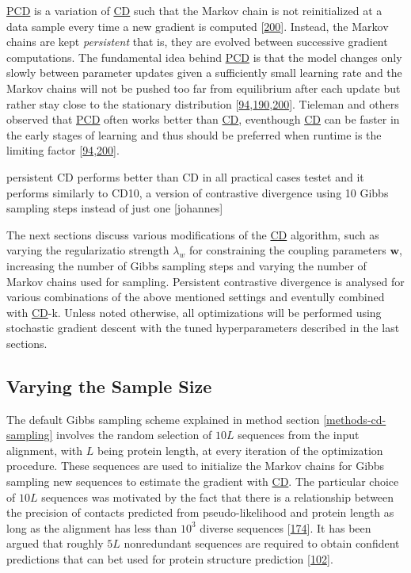 \documentclass[11pt,a4paper,twoside]{book}
\newcommand{\w}{\mathbf{w}}
\theoremstyle{definition}
\theoremstyle{definition}
\theoremstyle{remark}
\begin{document}
\protect\hyperlink{abbrev}{PCD} is a variation of
\protect\hyperlink{abbrev}{CD} such that the Markov chain is not
reinitialized at a data sample every time a new gradient is computed
{[}\protect\hyperlink{ref-Tieleman2008}{200}{]}. Instead, the Markov
chains are kept \emph{persistent} that is, they are evolved between
successive gradient computations. The fundamental idea behind
\protect\hyperlink{abbrev}{PCD} is that the model changes only slowly
between parameter updates given a sufficiently small learning rate and
the Markov chains will not be pushed too far from equilibrium after each
update but rather stay close to the stationary distribution
{[}\protect\hyperlink{ref-Murphy2012}{94},\protect\hyperlink{ref-Fischer2012}{190},\protect\hyperlink{ref-Tieleman2008}{200}{]}.
Tieleman and others observed that \protect\hyperlink{abbrev}{PCD} often
works better than \protect\hyperlink{abbrev}{CD}, eventhough
\protect\hyperlink{abbrev}{CD} can be faster in the early stages of
learning and thus should be preferred when runtime is the limiting
factor
{[}\protect\hyperlink{ref-Murphy2012}{94},\protect\hyperlink{ref-Tieleman2008}{200}{]}.

persistent CD performs better than CD in all practical cases testet and
it performs similarly to CD10, a version of contrastive divergence using
10 Gibbs sampling steps instead of just one {[}johannes{]}

The next sections discuss various modifications of the
\protect\hyperlink{abbrev}{CD} algorithm, such as varying the
regularizatio strength \(\lambda_w\) for constraining the coupling
parameters \(\w\), increasing the number of Gibbs sampling steps and
varying the number of Markov chains used for sampling. Persistent
contrastive divergence is analysed for various combinations of the above
mentioned settings and eventully combined with
\protect\hyperlink{abbrev}{CD}-k. Unless noted otherwise, all
optimizations will be performed using stochastic gradient descent with
the tuned hyperparameters described in the last sections.

\subsection{Varying the Sample Size}\label{cd-sampling-size}

The default Gibbs sampling scheme explained in method section
\ref{methods-cd-sampling} involves the random selection of \(10L\)
sequences from the input alignment, with \(L\) being protein length, at
every iteration of the optimization procedure. These sequences are used
to initialize the Markov chains for Gibbs sampling new sequences to
estimate the gradient with \protect\hyperlink{abbrev}{CD}. The
particular choice of \(10L\) sequences was motivated by the fact that
there is a relationship between the precision of contacts predicted from
pseudo-likelihood and protein length as long as the alignment has less
than \(10^3\) diverse sequences
{[}\protect\hyperlink{ref-Anishchenko2017}{174}{]}. It has been argued
that roughly \(5L\) nonredundant sequences are required to obtain
confident predictions that can bet used for protein structure prediction
{[}\protect\hyperlink{ref-Kamisetty2013}{102}{]}.
\end{document}
